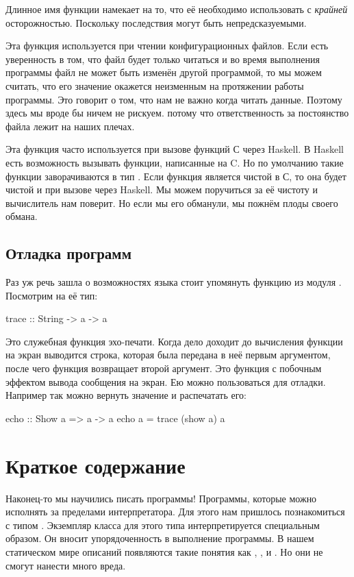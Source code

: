 Длинное имя функции намекает на то, что её необходимо
использовать с \emph{крайней} осторожностью. Поскольку
последствия могут быть непредсказуемыми. 

Эта функция используется при чтении конфигурационных файлов.
Если есть уверенность в том, что файл будет только читаться
и во время выполнения программы файл не может быть изменён 
другой программой, то мы можем считать, что его значение окажется
неизменным на протяжении работы программы. Это говорит о том, что 
нам не важно когда читать данные. Поэтому здесь мы вроде бы
ничем не рискуем.  потому что ответственность
за постоянство файла лежит на наших плечах. 

Эта функция часто используется при вызове функций С через
Haskell. В Haskell есть возможность вызывать функции,
написанные на C. Но по умолчанию такие функции заворачиваются
в тип . Если функция является
чистой в С, то она будет чистой и при вызове через Haskell. 
Мы можем поручиться за её чистоту и вычислитель нам поверит.
Но если мы его обманули, мы пожнём плоды своего обмана.

\subsection{Отладка программ}

Раз уж речь зашла о  возможностях 
языка стоит упомянуть функцию  из модуля
. Посмотрим на её тип:

\begin{code}
trace :: String -> a -> a
\end{code}

Это служебная функция эхо-печати. Когда дело доходит до вычисления 
функции  на экран выводится строка, которая была передана
в неё первым аргументом, после чего функция возвращает второй аргумент.
Это функция  с побочным эффектом вывода сообщения на экран.
Ею можно пользоваться для отладки. Например так можно вернуть
значение и распечатать его:

\begin{code}
echo :: Show a => a -> a
echo a = trace (show a) a
\end{code}

\section{Краткое содержание}

Наконец-то мы научились писать программы! Программы, которые
можно исполнять за пределами интерпретатора. Для этого нам
пришлось познакомиться с типом . Экземпляр класса
 для этого типа интерпретируется специальным образом. 
Он вносит упорядоченность в выполнение программы. В нашем статическом
мире описаний появляются такие понятия как ,
,  и . Но они не смогут
нанести много вреда. 

